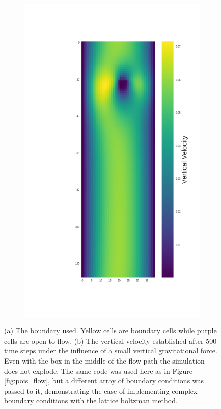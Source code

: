\documentclass[]{article}
\begin{document}
\begin{figure}
\begin{subfigure}[b]{0.49\textwidth}
		\includegraphics[width=\linewidth]{figures/box_boundary_result.png}
		\caption{}
		\label{fig:box_boundary_result}
	\end{subfigure}
	\caption[]{(a) The boundary used. Yellow cells are boundary cells while purple cells are open to flow. (b) The vertical velocity established after 500 time steps under the influence of a small vertical gravitational force. Even with the box in the middle of the flow path the simulation does not explode. The same code was used here as in Figure \ref{fig:pois_flow}, but a different array of boundary conditions was passed to it, demonstrating the ease of implementing complex boundary conditions with the lattice boltzman method.}
	\label{fig:box_boundary_all}
\end{figure}
\end{document}
